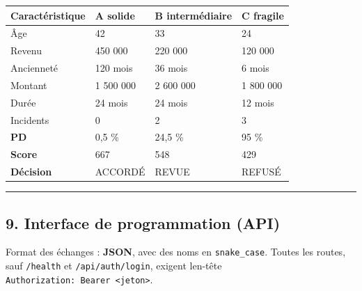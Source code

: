 \documentclass[
  french,
  11pt,
  a4paper,
]{article}
\begin{document}
\begin{longtable}[]{@{}llll@{}}
\toprule\noalign{}
Caractéristique & \textbf{A} solide & \textbf{B} intermédiaire &
\textbf{C} fragile \\
\midrule\noalign{}
\endhead
\bottomrule\noalign{}
\endlastfoot
Âge & 42 & 33 & 24 \\
Revenu & 450 000 & 220 000 & 120 000 \\
Ancienneté & 120 mois & 36 mois & 6 mois \\
Montant & 1 500 000 & 2 600 000 & 1 800 000 \\
Durée & 24 mois & 24 mois & 12 mois \\
Incidents & 0 & 2 & 3 \\
\textbf{PD} & 0,5 \% & 24,5 \% & 95 \% \\
\textbf{Score} & 667 & 548 & 429 \\
\textbf{Décision} & ACCORDÉ & REVUE & REFUSÉ \\
\end{longtable}

\begin{center}\rule{0.5\linewidth}{0.5pt}\end{center}

\subsection{9. Interface de programmation
(API)}\label{9-interface-de-programmation-api}

Format des échanges : \textbf{JSON}, avec des noms en
\texttt{snake\_case}. Toutes les routes, sauf \texttt{/health} et
\texttt{/\allowbreak{}api/\allowbreak{}auth/\allowbreak{}login}, exigent
l\textquotesingle en-tête
\texttt{Authorization:\ Bearer\ \textless{}jeton\textgreater{}}.
\end{document}
